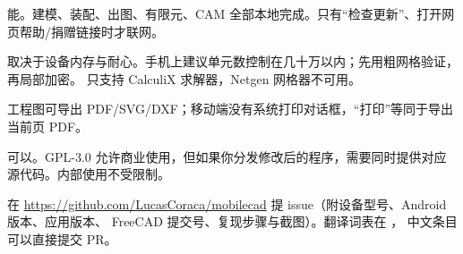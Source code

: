 \begin{description}[style=nextline,leftmargin=0pt]
\item[能离线使用吗？]
能。建模、装配、出图、有限元、CAM 全部本地完成。只有“检查更新”、打开网页帮助/捐赠链接时才联网。

\item[有限元能算多大？]
取决于设备内存与耐心。手机上建议单元数控制在几十万以内；先用粗网格验证，再局部加密。
只支持 CalculiX 求解器，Netgen 网格器不可用。

\item[能直接打印图纸吗？]
工程图可导出 PDF/SVG/DXF；移动端没有系统打印对话框，“打印”等同于导出当前页 PDF。

\item[GPL 许可证可以商用吗？]
可以。GPL-3.0 允许商业使用，但如果你分发修改后的程序，需要同时提供对应源代码。内部使用不受限制。

\item[怎样反馈问题或贡献翻译？]
在 \url{https://github.com/LucasCoraca/mobilecad} 提 issue（附设备型号、Android 版本、应用版本、
FreeCAD 提交号、复现步骤与截图）。翻译词表在 ，
中文条目可以直接提交 PR。

\end{description}
